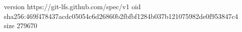 version https://git-lfs.github.com/spec/v1
oid sha256:469f478437acdc05054c6d26860b2fbfbf1284b037b121075982de0f953847c4
size 279670
